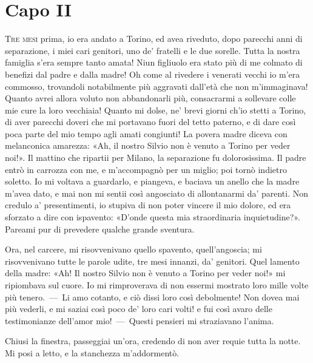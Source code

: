 
\chapter{Capo II}

\lettrine{T}{re mesi} prima, io era andato a Torino, ed avea riveduto, dopo parecchi
anni di separazione, i miei cari genitori, uno de' fratelli e le due
sorelle. Tutta la nostra famiglia s'era sempre tanto amata! Niun figliuolo
era stato più di me colmato di benefizi dal padre e dalla madre! Oh come al
rivedere i venerati vecchi io m'era commosso, trovandoli notabilmente più
aggravati dall'età che non m'immaginava! Quanto avrei allora voluto non
abbandonarli più, consacrarmi a sollevare colle mie cure la loro vecchiaia!
Quanto mi dolse, ne' brevi giorni ch'io stetti a Torino, di aver parecchi
doveri che mi portavano fuori del tetto paterno, e di dare così poca parte
del mio tempo agli amati congiunti! La povera madre diceva con melanconica
amarezza: «Ah, il nostro Silvio non è venuto a Torino per veder noi!». Il
mattino che ripartii per Milano, la separazione fu dolorosissima. Il padre
entrò in carrozza con me, e m'accompagnò per un miglio; poi tornò indietro
soletto. Io mi voltava a guardarlo, e piangeva, e baciava un anello che la
madre m'avea dato, e mai non mi sentii così angosciato di allontanarmi
da' parenti. Non credulo a' presentimenti, io stupiva di non poter vincere il
mio dolore, ed era sforzato a dire con ispavento: «D'onde questa mia
straordinaria inquietudine?». Pareami pur di prevedere qualche grande
sventura.

Ora, nel carcere, mi risovvenivano quello spavento, quell'angoscia; mi
risovvenivano tutte le parole udite, tre mesi innanzi, da' genitori. Quel
lamento della madre: «Ah! Il nostro Silvio non è venuto a Torino per veder
noi!» mi ripiombava sul cuore. Io mi rimproverava di non essermi mostrato
loro mille volte più tenero.~---~Li amo cotanto, e ciò dissi loro così
debolmente! Non dovea mai più vederli, e mi saziai così poco de' loro cari
volti! e fui così avaro delle testimonianze dell'amor mio!~---~Questi
pensieri mi straziavano l'anima.

Chiusi la finestra, passeggiai un'ora, credendo di non aver requie tutta la
notte. Mi posi a letto, e la stanchezza m'addormentò.
